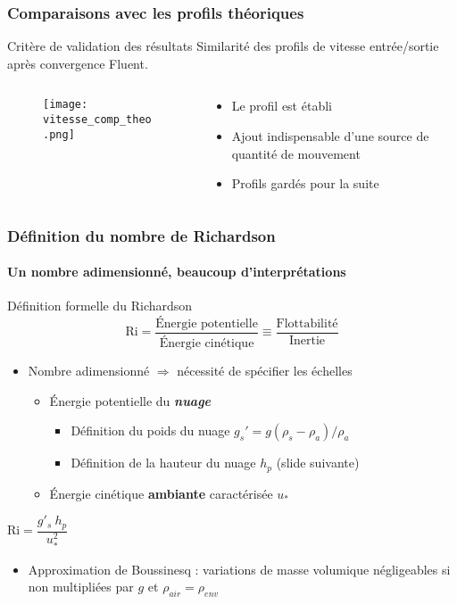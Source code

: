 \documentclass[12pt, xcolor=svgnames]{beamer}
\newcommand{\qttmvt}{quantité de mouvement}
\newcommand{\bwarrow}{\item[\color{DarkRed} \ding{227}]}
\newcommand{\warrow}{\item[\color{blue!50!black!70} \tiny{\ding{109}}]}
\newcommand{\sarrow}{\item[\color{blue!50!black!70!orange!60} \tiny{\ding{55}}]}
\newcommand{\bepar}[1]{
	\left( #1 \right)  
}
\begin{document}
\begin{frame}
\frametitle{Comparaisons avec les profils théoriques}
	\begin{block}{Critère de validation des résultats}
		Similarité des profils de vitesse entrée/sortie après convergence Fluent.
	\end{block}
\begin{columns}
\begin{column}{0.6\textwidth}
\vspace{-1.1cm}
\begin{figure}[!ht]
\centering
\texttt{[image: vitesse\_comp\_theo.png]}
\end{figure}
\end{column}
\pause
\begin{column}{0.4\textwidth}
\begin{itemize}
	\bwarrow \small{Le profil est établi} \\ 
	\bwarrow \small{Ajout indispensable d'une source de \qttmvt} \\ 
	\bwarrow \small{Profils gardés pour la suite}
\end{itemize}

\end{column}
\end{columns}
\end{frame}

\begin{frame}
\frametitle{Définition du nombre de Richardson}
\framesubtitle{Un nombre adimensionné, beaucoup d'interprétations}
\begin{block}{Définition formelle du Richardson}
\begin{equation*}
\text{Ri} = \frac{\text{Énergie potentielle}}{\text{Énergie cinétique}} \equiv \frac{\text{Flottabilité}}{\text{Inertie}}
\end{equation*}

\end{block}
\pause
\begin{itemize}
	\bwarrow Nombre adimensionné $\Rightarrow$ nécessité de spécifier les échelles
		\begin{itemize}
		\warrow Énergie potentielle du \textit{\textbf{nuage}} 
			\begin{itemize}
				\sarrow Définition du poids du nuage $g_s' = g \bepar{\rho_s - \rho_a}/\rho_a$
				\sarrow Définition de la hauteur du nuage $h_p$ (slide suivante)
			\end{itemize}
		\warrow Énergie cinétique \textbf{ambiante} caractérisée $u_*$
		\end{itemize}
\end{itemize}
 \begin{center}$\displaystyle \text{Ri} = \dfrac{g'_s~h_p}{u_*^2}$ \end{center}
 
\begin{itemize}
\bwarrow Approximation de Boussinesq : variations de masse volumique négligeables si non multipliées par $g$ et $\rho_{air} = \rho_{env}$
\end{itemize}


\end{frame}
\end{document}
